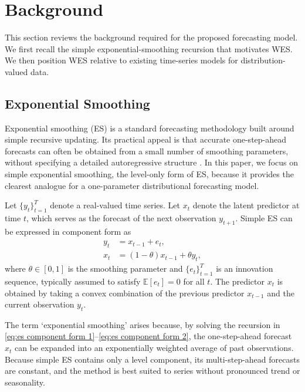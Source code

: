 \documentclass[a4paper, 11pt]{article}
\newcommand{\E}{\mathbb E}
\theoremstyle{definition}
\begin{document}
\section{Background} \label{sec:background}

This section reviews the background required for the proposed forecasting model. 
We first recall the simple exponential-smoothing recursion that motivates WES.
We then position WES relative to existing time-series models for distribution-valued data.

\subsection{Exponential Smoothing}

Exponential smoothing (ES) is a standard forecasting methodology built around simple recursive updating. 
Its practical appeal is that accurate one-step-ahead forecasts can often be obtained from a small number of smoothing parameters, without specifying a detailed autoregressive structure \citep{Gardner1985,Gardner2006,Hyndman2008}. 
In this paper, we focus on simple exponential smoothing, the level-only form of ES, because it provides the clearest analogue for a one-parameter distributional forecasting model.

Let $\{ y_t \}_{t=1}^{T}$ denote a real-valued time series.
Let $x_t$ denote the latent predictor at time $t$, which serves as the forecast of the next observation $y_{t+1}$.
Simple ES can be expressed in component form as
\begin{align}
    y_t &= x_{t-1} + e_t, \label{eq:es component form 1}\\
    x_t &= (1-\theta)x_{t-1} + \theta y_t, \label{eq:es component form 2}
\end{align}
where $\theta \in [0,1]$ is the smoothing parameter and $\{ e_t \}_{t=1}^{T}$ is an innovation sequence, typically assumed to satisfy $\E[e_t] = 0$ for all $t$.
The predictor $x_t$ is obtained by taking a convex combination of the previous predictor $x_{t-1}$ and the current observation $y_t$. 

The term `exponential smoothing' arises because, by solving the recursion in \eqref{eq:es component form 1}--\eqref{eq:es component form 2}, the one-step-ahead forecast $x_t$ can be expanded into an exponentially weighted average of past observations.
Because simple ES contains only a level component, its multi-step-ahead forecasts are constant, and the method is best suited to series without pronounced trend or seasonality.
\end{document}
